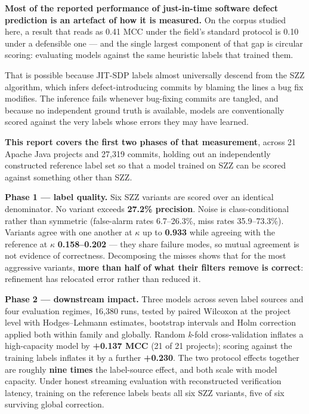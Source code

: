 \textbf{Most of the reported performance of just-in-time software defect
prediction is an artefact of how it is measured.} On the corpus studied
here, a result that reads as 0.41 MCC under the field's standard
protocol is 0.10 under a defensible one --- and the single largest
component of that gap is circular scoring: evaluating models against the
same heuristic labels that trained them.

That is possible because JIT-SDP labels almost universally descend from
the SZZ algorithm, which infers defect-introducing commits by blaming
the lines a bug fix modifies. The inference fails whenever bug-fixing
commits are tangled, and because no independent ground truth is
available, models are conventionally scored against the very labels
whose errors they may have learned.

\textbf{This report covers the first two phases of that measurement},
across 21 Apache Java projects and 27,319 commits, holding out an
independently constructed reference label set so that a model trained on
SZZ can be scored against something other than SZZ.

\textbf{Phase 1 --- label quality.} Six SZZ variants are scored over an
identical denominator. No variant exceeds \textbf{27.2\% precision}.
Noise is class-conditional rather than symmetric (false-alarm rates
6.7--26.3\%, miss rates 35.9--73.3\%). Variants agree with one another
at \ensuremath{\kappa} up to \textbf{0.933} while agreeing with the reference at \ensuremath{\kappa}
\textbf{0.158--0.202} --- they share failure modes, so mutual agreement
is not evidence of correctness. Decomposing the misses shows that for
the most aggressive variants, \textbf{more than half of what their
filters remove is correct}: refinement has relocated error rather than
reduced it.

\textbf{Phase 2 --- downstream impact.} Three models across seven label
sources and four evaluation regimes, 16,380 runs, tested by paired
Wilcoxon at the project level with Hodges--Lehmann estimates, bootstrap
intervals and Holm correction applied both within family and globally.
Random \emph{k}-fold cross-validation inflates a high-capacity model by
\textbf{+0.137 MCC} (21 of 21 projects); scoring against the training
labels inflates it by a further \textbf{+0.230}. The two protocol
effects together are roughly \textbf{nine times} the label-source
effect, and both scale with model capacity. Under honest streaming
evaluation with reconstructed verification latency, training on the
reference labels beats all six SZZ variants, five of six surviving
global correction.


